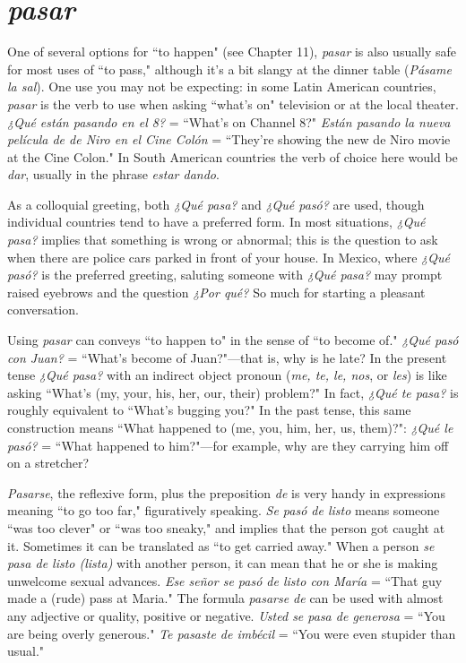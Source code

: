 \section{\emph{pasar}}

One of several options for ``to happen" (see Chapter 11), \emph{pasar}
is also usually safe for most uses of ``to pass," although it's a bit slangy
at the dinner table (\emph{Pásame la sal}). One use you may not be expecting:
in some Latin American countries, \emph{pasar} is the verb to use when asking ``what's on" television or at the local theater. \emph{¿Qué están pasando
	en el 8?} = ``What's on Channel 8?" \emph{Están pasando la nueva película
	de de Niro en el Cine Colón} = ``They're showing the new de Niro
movie at the Cine Colon." In South American countries the verb of
choice here would be \emph{dar}, usually in the phrase \emph{estar dando}.

As a colloquial greeting, both \emph{¿Qué pasa?} and \emph{¿Qué pasó?} are
used, though individual countries tend to have a preferred form. In
most situations, \emph{¿Qué pasa?} implies that something is wrong or abnormal; this is the question to ask when there are police cars parked in
front of your house. In Mexico, where \emph{¿Qué pasó?} is the preferred
greeting, saluting someone with \emph{¿Qué pasa?} may prompt raised eyebrows and the question \emph{¿Por qué?} So much for starting a pleasant
conversation.

Using \emph{pasar} can conveys ``to happen to" in the sense of ``to
become of." \emph{¿Qué pasó con Juan?} = ``What's become of Juan?"---that
is, why is he late? In the present tense \emph{¿Qué pasa?} with an indirect
object pronoun (\emph{me, te, le, nos}, or \emph{les}) is like asking ``What's (my, your,
his, her, our, their) problem?" In fact, \emph{¿Qué te pasa?} is roughly equivalent to ``What's bugging you?" In the past tense, this same construction means ``What happened to (me, you, him, her, us, them)?": \emph{¿Qué
	le pasó?} = ``What happened to him?"---for example, why are they carrying him off on a stretcher?

\emph{Pasarse}, the reflexive form, plus the preposition \emph{de} is very
handy in expressions meaning ``to go too far," figuratively speaking. \emph{Se
	pasó de listo} means someone ``was too clever" or ``was too sneaky,"
and implies that the person got caught at it. Sometimes it can be translated as ``to get carried away." When a person \emph{se pasa de listo (lista)}
with another person, it can mean that he or she is making unwelcome
sexual advances. \emph{Ese señor se pasó de listo con María} = ``That guy
made a (rude) pass at Maria." The formula \emph{pasarse de} can be used with
almost any adjective or quality, positive or negative. \emph{Usted se pasa de
	generosa} = ``You are being overly generous." \emph{Te pasaste de imbécil} =
``You were even stupider than usual."

